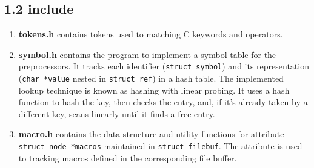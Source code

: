\subsection*{1.2 \large\textbf{include}}
\begin{enumerate}
    \item \textbf{tokens.h} contains tokens used to matching C keywords and operators.
    \item \textbf{symbol.h} contains the program to implement a symbol table for the preprocessors. It tracks each identifier (\texttt{struct symbol}) and its representation (\texttt{char *value} nested in \texttt{struct ref}) in a hash table. The implemented lookup technique is known as hashing with linear probing. It uses a hash function to hash the key, then checks the entry, and, if it’s already taken by a different key, scans linearly until it finds a free entry.
    \item \textbf{macro.h} contains the data structure and utility functions for attribute \texttt{struct node *macros} maintained in \texttt{struct filebuf}. The attribute is used to tracking macros defined in the corresponding file buffer.
\end{enumerate} 